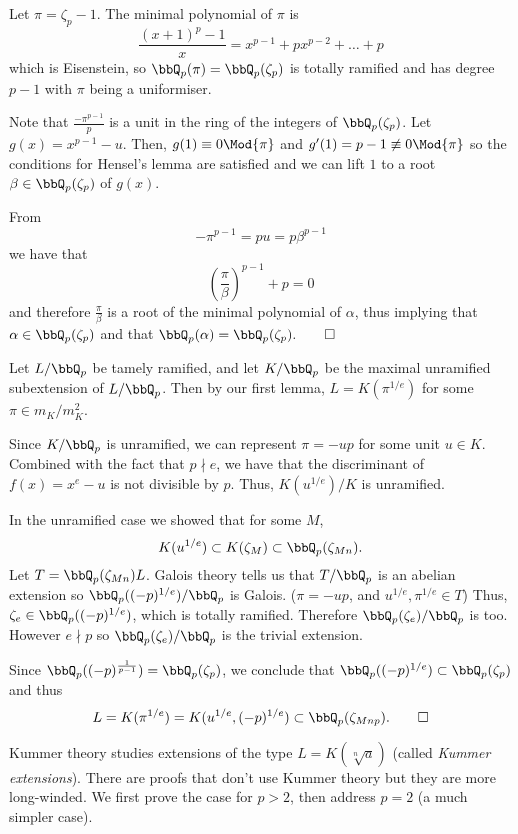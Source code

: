 \documentclass[a4paper, 12pt,oneside,openany]{book}
\begin{document}
Let $\pi = \zeta_p-1$. The minimal polynomial of $\pi$ is $$\frac{(x+1)^p-1}{x} = x^{p-1}+px^{p-2}+\dots+p$$ which is Eisenstein, so $\bbQ_p(\pi)=\bbQ_p(\zeta_p)$ is totally ramified and has degree $p-1$ with $\pi$ being a uniformiser.

Note that $\frac{-\pi^{p-1}}{p}$ is a unit in the ring of the integers of $\bbQ_p(\zeta_p)$. Let $g(x) = x^{p-1}-u$. Then, $g(1)\equiv 0 \Mod{\pi}$ and $g'(1) = p-1 \not\equiv 0 \Mod{\pi}$ so the conditions for Hensel's lemma are satisfied and we can lift $1$ to a root $\beta \in \bbQ_p(\zeta_p)$ of $g(x)$.

From $$-\pi^{p-1}=pu = p\beta^{p-1}$$ we have that $$(\frac{\pi}{\beta})^{p-1}+p=0$$ and therefore $\frac{\pi}{\beta}$ is a root of the minimal polynomial of $\alpha$, thus implying that $\alpha \in \bbQ_p(\zeta_p)$ and that $\bbQ_p(\alpha)=\bbQ_p(\zeta_p). \qed$

Let $L/\bbQ_p$ be tamely ramified, and let $K/\bbQ_p$ be the maximal unramified subextension of $L/\bbQ_p$. Then by our first lemma, $L=K(\pi^{1/e})$ for some $\pi \in m_K/m_K^2$. 

Since $K/\bbQ_p$ is unramified, we can represent $\pi = -up$ for some unit $u \in K$. Combined with the fact that $p \nmid e$, we have that the discriminant of $f(x)=x^e-u$ is not divisible by $p$. Thus, $K(u^{1/e})/K$ is unramified.

In the unramified case we showed that for some $M$, $$K(u^{1/e}) \subset K(\zeta_M) \subset \bbQ_p(\zeta_{Mn}).$$ Let $T=\bbQ_p(\zeta_{Mn})L$. Galois theory tells us that $T/\bbQ_p$ is an abelian extension so $\bbQ_p((-p)^{1/e})/\bbQ_p$ is Galois. ($\pi=-up$, and $u^{1/e}, \pi^{1/e} \in T$) Thus, $\zeta_e \in \bbQ_p((-p)^{1/e})$, which is totally ramified. Therefore $\bbQ_p(\zeta_e)/\bbQ_p$ is too. However $e \nmid p$ so $\bbQ_p(\zeta_e)/\bbQ_p$ is the trivial extension. 

Since $\bbQ_p((-p)^{\frac{1}{p-1}})=\bbQ_p(\zeta_p)$, we conclude that $\bbQ_p((-p)^{1/e}) \subset \bbQ_p(\zeta_p)$ and thus $$L=K(\pi^{1/e}) = K(u^{1/e}, (-p)^{1/e}) \subset \bbQ_p(\zeta_{Mnp}). \qed$$


Kummer theory studies extensions of the type $L=K(\sqrt[n]{a})$ (called \emph{Kummer extensions}). There are proofs that don't use Kummer theory but they are more long-winded. We first prove the case for $p>2$, then address $p=2$ (a much simpler case). 

\end{document}
